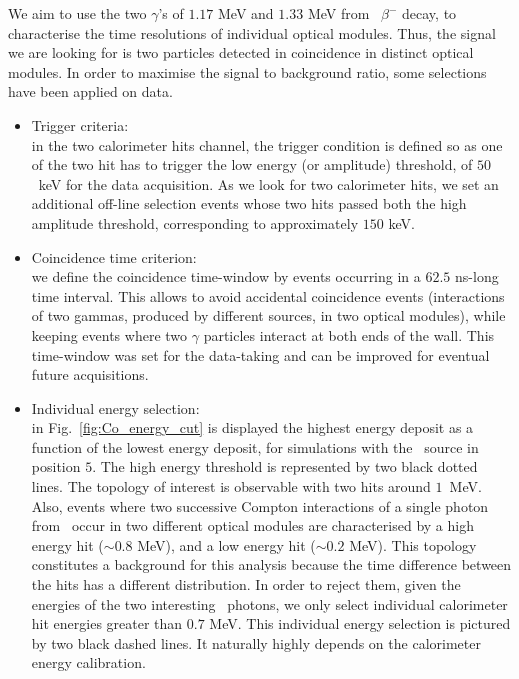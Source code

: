 We aim to use the two $\gamma$'s of $1.17$ MeV and $1.33$ MeV from \Co\ $\beta^{-}$ decay, to characterise the time resolutions of individual optical modules.
Thus, the signal we are looking for is two particles detected in coincidence in distinct optical modules.
In order to maximise the signal to background ratio, some selections have been applied on data.
\begin{itemize}
\item Trigger criteria:\\ in the two calorimeter hits channel, the trigger condition is defined so as one of the two hit has to trigger the low energy (or amplitude) threshold, of $50$~keV for the data acquisition.
  As we look for two calorimeter hits, we set an additional off-line selection events whose two hits passed both the high amplitude threshold, corresponding to approximately $150$ keV.
\item Coincidence time criterion:\\ we define the coincidence time-window by events occurring in a $62.5$ ns-long time interval.
  This allows to avoid accidental coincidence events (interactions of two gammas, produced by different sources, in two optical modules), while keeping events where two $\gamma$ particles interact at both ends of the wall.
  This time-window was set for the data-taking and can be improved for eventual future acquisitions.
\item Individual energy selection:\\ in Fig.~\ref{fig:Co_energy_cut} is displayed the highest energy deposit as a function of the lowest energy deposit, for simulations with the \Co\ source in position $5$.
  The high energy threshold is represented by two black dotted lines.
  The topology of interest is observable with two hits around $1$~MeV.
  Also, events where two successive Compton interactions of a single photon from \Co\ occur in two different optical modules are characterised by a high energy hit ($\sim 0.8$ MeV), and a low energy hit ($\sim 0.2$ MeV).
  This topology constitutes a background for this analysis because the time difference between the hits has a different distribution.
  In order to reject them, given the energies of the two interesting \Co\ photons, we only select individual calorimeter hit energies greater than $0.7$ MeV.
  This individual energy selection is pictured by two black dashed lines.
  It naturally highly depends on the calorimeter energy calibration.

\end{itemize}
